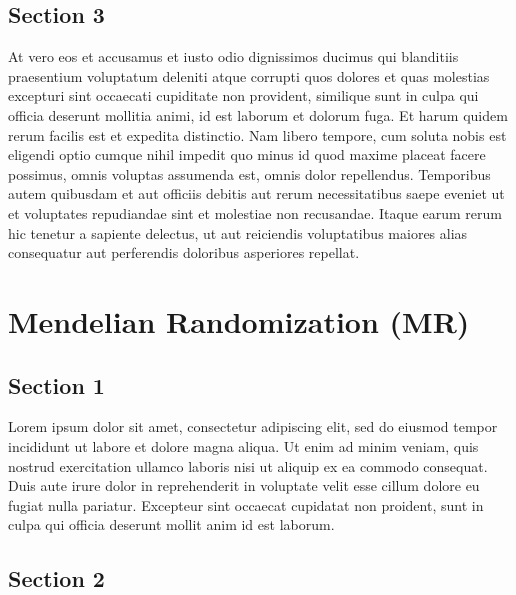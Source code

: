 \documentclass[
]{book}
\begin{document}
\hypertarget{section-3-6}{%
\section{Section 3}\label{section-3-6}}

At vero eos et accusamus et iusto odio dignissimos ducimus qui blanditiis praesentium voluptatum deleniti atque corrupti quos dolores et quas molestias excepturi sint occaecati cupiditate non provident, similique sunt in culpa qui officia deserunt mollitia animi, id est laborum et dolorum fuga. Et harum quidem rerum facilis est et expedita distinctio. Nam libero tempore, cum soluta nobis est eligendi optio cumque nihil impedit quo minus id quod maxime placeat facere possimus, omnis voluptas assumenda est, omnis dolor repellendus. Temporibus autem quibusdam et aut officiis debitis aut rerum necessitatibus saepe eveniet ut et voluptates repudiandae sint et molestiae non recusandae. Itaque earum rerum hic tenetur a sapiente delectus, ut aut reiciendis voluptatibus maiores alias consequatur aut perferendis doloribus asperiores repellat.

\hypertarget{mendelian-randomization-mr}{%
\chapter{Mendelian Randomization (MR)}\label{mendelian-randomization-mr}}

\hypertarget{section-1-7}{%
\section{Section 1}\label{section-1-7}}

Lorem ipsum dolor sit amet, consectetur adipiscing elit, sed do eiusmod tempor incididunt ut labore et dolore magna aliqua. Ut enim ad minim veniam, quis nostrud exercitation ullamco laboris nisi ut aliquip ex ea commodo consequat. Duis aute irure dolor in reprehenderit in voluptate velit esse cillum dolore eu fugiat nulla pariatur. Excepteur sint occaecat cupidatat non proident, sunt in culpa qui officia deserunt mollit anim id est laborum.

\hypertarget{section-2-7}{%
\section{Section 2}\label{section-2-7}}
\end{document}
